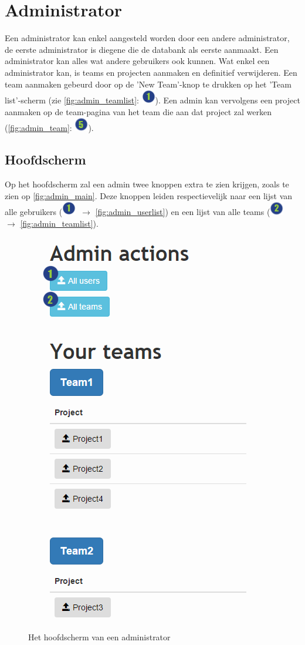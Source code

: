 \documentclass[a4paper,11pt]{article}
\newcommand{\one}{\includegraphics[scale=0.5]{Gebruikershandleiding_img/1.png}}
\newcommand{\two}{\includegraphics[scale=0.5]{Gebruikershandleiding_img/2.png}}
\newcommand{\five}{\includegraphics[scale=0.5]{Gebruikershandleiding_img/5.png}}
\begin{document}
\section{Administrator}
\label{sec:admin}
Een administrator kan enkel aangesteld worden door een andere administrator, de eerste administrator is diegene die de databank als eerste aanmaakt. Een administrator kan alles wat andere gebruikers ook kunnen. Wat enkel een administrator kan, is teams en projecten aanmaken en definitief verwijderen. Een team aanmaken gebeurd door op de 'New Team'-knop te drukken op het 'Team list'-scherm (zie \autoref{fig:admin_teamlist}: \one). Een admin kan vervolgens een project aanmaken op de team-pagina van het team die aan dat project zal werken (\autoref{fig:admin_team}: \five).

\subsection{Hoofdscherm}
\label{sec:admin_main}
Op het hoofdscherm zal een admin twee knoppen extra te zien krijgen, zoals te zien op \autoref{fig:admin_main}. Deze knoppen leiden respectievelijk naar een lijst van alle gebruikers (\one\ $\rightarrow$ \autoref{fig:admin_userlist}) en een lijst van alle teams (\two\ $\rightarrow$ \autoref{fig:admin_teamlist}).

\begin{figure}[H]
\centering
\includegraphics[scale=0.5]{Gebruikershandleiding_img/admin_main.png}
\caption{Het hoofdscherm van een administrator}
\label{fig:admin_main}
\end{figure}
\end{document}
